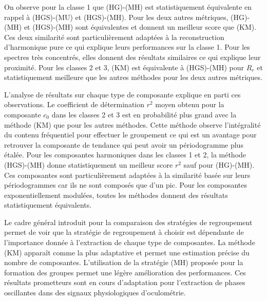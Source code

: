 \documentclass{gretsi}
\begin{document}
\begin{sloppypar}
On observe pour la classe 1 que (HG)-(MH) est statistiquement équivalente en rappel à (HGS)-(MU) et (HGS)-(MH). 
Pour les deux autres métriques, (HG)-(MH) et (HGS)-(MH) sont équivalentes et donnent un meilleur score que (KM).
Ces deux similarité sont particulièrement adaptées à la reconstruction d'harmonique pure ce qui explique leurs performances sur la classe 1. 
Pour les spectres très concentrés, elles donnent des résultats similaires ce qui explique leur proximité.
Pour les classes 2 et 3, (KM) est équivalente à (HGS)-(MH) pour $R_r$ et statistiquement meilleure que les autres méthodes pour les deux autres métriques.

L'analyse de résultats sur chaque type de composante explique en parti ces observations.
Le coefficient de détermination $r^2$ moyen obtenu pour la composante $c_0$ dans les classes 2 et 3 est en probabilité plus grand avec la méthode (KM) que pour les autres méthodes. 
Cette méthode observe l'intégralité du contenu fréquentiel pour effectuer le groupement ce qui est un avantage pour retrouver la composante de tendance qui peut avoir un périodogramme plus étalée. 
Pour les composantes harmoniques dans les classes 1 et 2, la méthode (HGS)-(MH) donne statistiquement un meilleur score $r^2$ sauf pour (HG)-(MH). 
Ces composantes sont particulièrement adaptées à la similarité basée sur leurs périodogrammes car ils ne sont composés que d'un pic.
Pour les composantes exponentiellement modulées, toutes les méthodes donnent des résultats statistiquement équivalents.
\end{sloppypar}

Le cadre général introduit pour la comparaison des stratégies de regroupement permet de voir que la stratégie de regroupement à choisir est dépendante de l'importance donnée à l'extraction de chaque type de composantes.
La méthode (KM) apparaît comme la plus adaptative et permet une estimation précise du nombre de composantes.
L'utilisation de la stratégie (MH) proposée pour la formation des groupes permet une légère amélioration des performances.
Ces résultats prometteurs sont en cours d'adaptation pour l'extraction de phases oscillantes dans des signaux physiologiques d'oculométrie.


 
\scriptsize
{}
\end{document}
